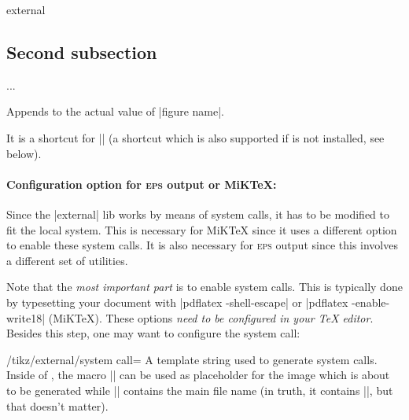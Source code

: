 {\begin{pgfplotslibrary}{external}
\begin{command}{}
\begin{codeexample}
{    \section{Second subsection}
    {
        ...
    }
}
\end{codeexample}
    \end{command}

    \begin{command}{\tikzappendtofigurename{}}
        Appends  to the actual value of |figure name|.

        It is a shortcut for
        || (a shortcut
        which is also supported if \tikzname{} is not installed, see below).
    \end{command}


    \paragraph{Configuration option for \textsc{eps} output or MiK\TeX{}:}

    Since the |external| lib works by means of system calls, it has to be
    modified to fit the local system. This is necessary for MiK\TeX{} since it
    uses a different option to enable these system calls. It is also necessary
    for \textsc{eps} output since this involves a different set of utilities.

    Note that the \emph{most important part} is to enable system calls. This is
    typically done by typesetting your document with |pdflatex -shell-escape|
    or |pdflatex -enable-write18| (MiK\TeX{}). These options \emph{need to be
    configured in your \TeX{} editor}. Besides this step, one may want to
    configure the system call:

    \begin{key}{/tikz/external/system call=}
    \label{extlib:systemcall:option}
        A template string used to generate system calls. Inside of
        , the macro |\image| can be used as placeholder for the
        image which is about to be generated while |\texsource| contains the
        main file name (in truth, it contains ||,
        but that doesn't matter).


\end{key}
\end{pgfplotslibrary}}
